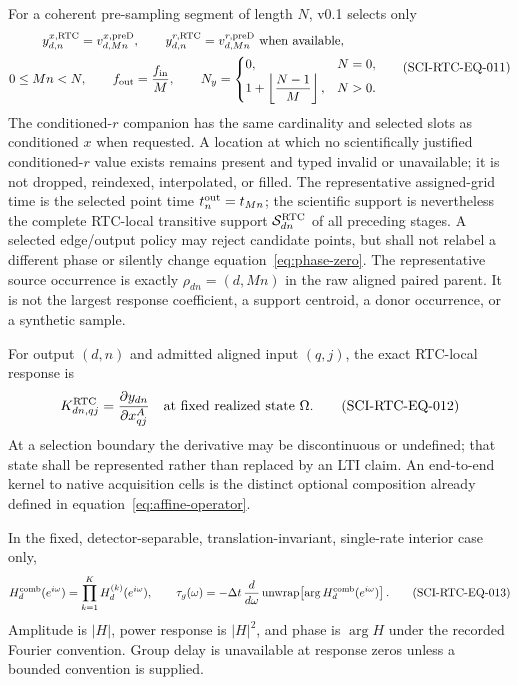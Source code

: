 For a coherent pre-sampling segment of length $N$, v0.1 selects only
\begin{equation}
 \begin{gathered}
 y^{x,\rm RTC}_{d,n}=v^{x,\rm preD}_{d,Mn},\qquad
 y^{r,\rm RTC}_{d,n}=v^{r,\rm preD}_{d,Mn}\ \text{when available},\\
 0\le Mn<N,\qquad f_{\rm out}=\frac{f_{\rm in}}{M},\qquad
 N_y=\begin{cases}0,&N=0,\\1+\left\lfloor\dfrac{N-1}{M}\right\rfloor,&N>0.
 \end{cases}
 \end{gathered}
 \tag{SCI-RTC-EQ-011}\label{eq:phase-zero}
\end{equation}
The conditioned-$r$ companion has the same cardinality and selected slots as
conditioned $x$ when requested.  A location at which no scientifically
justified conditioned-$r$ value exists remains present and typed invalid or
unavailable; it is not dropped, reindexed, interpolated, or filled.  The
representative assigned-grid time is the selected point time
$t^{\rm out}_n=t_{Mn}$; the scientific support is nevertheless the complete
RTC-local transitive support $\mathcal S^{\rm RTC}_{dn}$ of all preceding
stages.  A selected
edge/output policy may reject candidate points, but shall not relabel a
different phase or silently change equation~\eqref{eq:phase-zero}.
The representative source occurrence is exactly
$\rho_{dn}=(d,Mn)$ in the raw aligned paired parent.  It is not the
largest response coefficient, a support centroid, a donor occurrence, or a
synthetic sample.

For output $(d,n)$ and admitted aligned input $(q,j)$, the exact RTC-local
response is
\begin{equation}
 K^{\rm RTC}_{dn,qj}=\frac{\partial y_{dn}}
                 {\partial x^{A}_{qj}}
 \quad\text{at fixed realized state }\Omega .
 \tag{SCI-RTC-EQ-012}\label{eq:local-kernel}
\end{equation}
At a selection boundary the derivative may be discontinuous or undefined;
that state shall be represented rather than replaced by an LTI claim.  An
end-to-end kernel to native acquisition cells is the distinct optional
composition already defined in equation~\eqref{eq:affine-operator}.

In the fixed, detector-separable, translation-invariant, single-rate interior
case only,
\begin{equation}
 H^{\rm comb}_d(e^{i\omega})=
 \prod_{k=1}^{K}H^{(k)}_d(e^{i\omega}),
 \qquad
 \tau_g(\omega)=-\Delta t\,\frac{d}{d\omega}
 \operatorname{unwrap}\!\left[\arg H^{\rm comb}_d(e^{i\omega})\right].
 \tag{SCI-RTC-EQ-013}\label{eq:lti-response}
\end{equation}
Amplitude is $|H|$, power response is $|H|^2$, and phase is $\arg H$ under
the recorded Fourier convention.  Group delay is unavailable at response
zeros unless a bounded convention is supplied.


